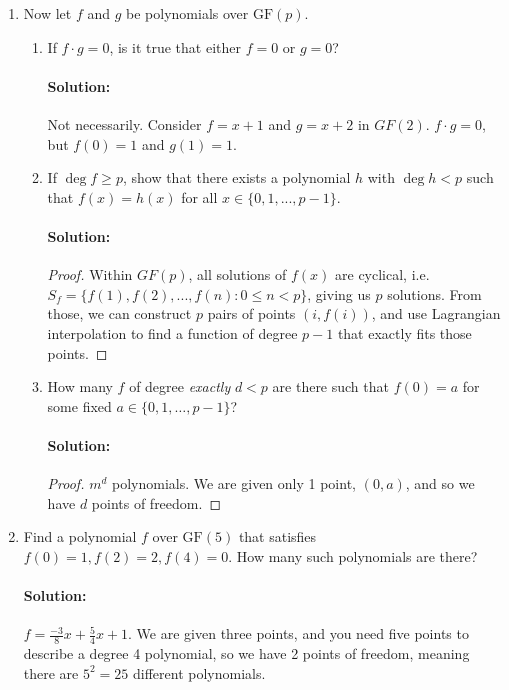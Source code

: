 \documentclass[11pt, notitlepage]{report}
\newenvironment{solution}{\paragraph{Solution:}}{\hfill}
\begin{document}
\begin{enumerate}[label=\alph*)]
	\item Now let $f$ and $g$ be polynomials over $\mathrm{GF}(p)$.
    \begin{enumerate}[label=\roman*.)]
        \item If $f\cdot g = 0$, is it true that either $f=0$ or $g=0$?
        \begin{solution}
		Not necessarily. Consider $f=x+1$ and $g=x+2$ in $GF(2)$. $f \cdot g = 0$, but $f(0)=1$ and $g(1)=1$. 
        \end{solution}
        \item If $\deg{f} \geq p$, show that there exists a polynomial $h$ with 
            $\deg{h} < p$ such that $f(x) = h(x)$ for all $x \in \{0,1,...,p-1\}$.
        \begin{solution}\begin{proof}
        	Within $GF(p)$, all solutions of $f(x)$ are cyclical, i.e. $S_f = \{f(1), f(2),...,f(n):0\leq n<p\}$, giving us $p$ solutions. From those, we can construct $p$ pairs of points $(i, f(i))$, and use Lagrangian interpolation to find a function of degree $p-1$ that exactly fits those points.
        \end{proof}\end{solution}

	\newpage
        \item How many $f$ of degree \textit{exactly} $d<p$ are there such that 
            $f(0) = a$ for some fixed $a\in\{0,1,\dots,p-1\}$?
            
            \begin{solution}
            	\begin{proof}
            		$m^d$ polynomials. We are given only 1 point, $(0, a)$, and so we have $d$ points of freedom.
            	\end{proof}
            \end{solution}
    \end{enumerate}

    \item Find a polynomial $f$ over $\mathrm{GF}(5)$ that satisfies 
    $f(0) = 1, f(2) = 2, f(4) = 0$. How many such polynomials are there?
    \begin{solution}
    	$f=\frac{-3}{8}x+\frac{5}{4}x+1$. We are given three points, and you need five points to describe a degree 4 polynomial, so we have 2 points of freedom, meaning there are $5^2=25$ different polynomials.
    \end{solution}
\end{enumerate}
    
\end{document}
